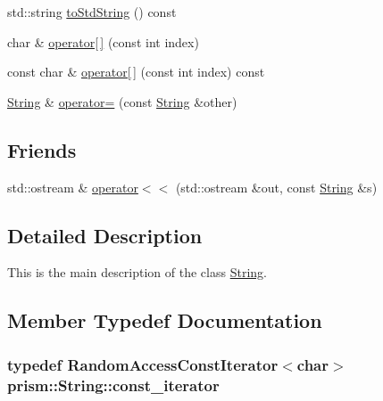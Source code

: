 \begin{DoxyCompactItemize}
\item 
std\+::string \hyperlink{classprism_1_1_string_ad1018741610a6723a38ab52255147ac4}{to\+Std\+String} () const 
\item 
char \& \hyperlink{classprism_1_1_string_a2aa545085262fc28c9199a5790bfbd0a}{operator\mbox{[}$\,$\mbox{]}} (const int index)
\item 
const char \& \hyperlink{classprism_1_1_string_ad519fe1a0696fe5c4b77808d605bc68e}{operator\mbox{[}$\,$\mbox{]}} (const int index) const 
\item 
\hyperlink{classprism_1_1_string}{String} \& \hyperlink{classprism_1_1_string_ad2c84ac36bccdb26c446d32a1615f321}{operator=} (const \hyperlink{classprism_1_1_string}{String} \&other)
\end{DoxyCompactItemize}
\subsection*{Friends}
\begin{DoxyCompactItemize}
\item 
std\+::ostream \& \hyperlink{classprism_1_1_string_a22f0a77d546199afaac3503fc9b9ef51}{operator$<$$<$} (std\+::ostream \&out, const \hyperlink{classprism_1_1_string}{String} \&s)
\end{DoxyCompactItemize}


\subsection{Detailed Description}
This is the main description of the class \hyperlink{classprism_1_1_string}{String}. 

\subsection{Member Typedef Documentation}
\subsubsection[{\texorpdfstring{const\+\_\+iterator}{const_iterator}}]{\setlength{\rightskip}{0pt plus 5cm}typedef {\bf Random\+Access\+Const\+Iterator}$<$char$>$ {\bf prism\+::\+String\+::const\+\_\+iterator}}\hypertarget{classprism_1_1_string_a8b46f0fbe9c5c94ba892975242e3ab68}{}\label{classprism_1_1_string_a8b46f0fbe9c5c94ba892975242e3ab68}
